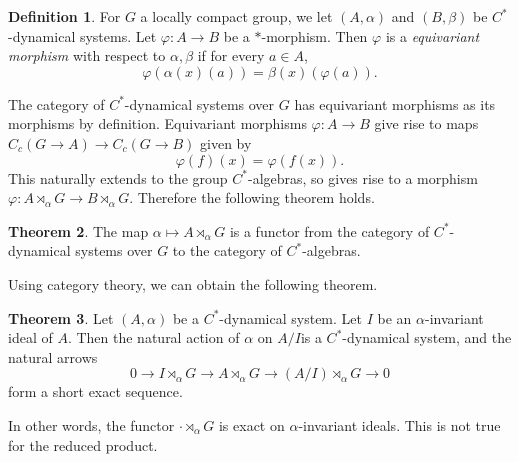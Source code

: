 \documentclass[12pt]{report}
\newcommand{\dfn}[1]{\emph{#1}\index{#1}}
\theoremstyle{definition}
\newtheorem{theorem}{Theorem}[chapter]
\newtheorem{definition}[theorem]{Definition}
\begin{document}
\begin{definition}
    For $G$ a locally compact group, we let $(A, \alpha)$ and $(B, \beta)$ be $C^*$-dynamical systems. Let $\varphi: A \to B$ be a $*$-morphism. Then $\varphi$ is a \dfn{equivariant morphism} with respect to $\alpha,\beta$ if for every $a \in A$,
    $$\varphi(\alpha(x)(a)) = \beta(x)(\varphi(a)).$$
\end{definition}
    The category of $C^*$-dynamical systems over $G$ has equivariant morphisms as its morphisms by definition. Equivariant morphisms $\varphi:A \to B$ give rise to maps $C_c(G \to A) \to C_c(G \to B)$ given by
    $$\varphi(f)(x) = \varphi(f(x)).$$
    This naturally extends to the group $C^*$-algebras, so gives rise to a morphism $\varphi: A \rtimes_\alpha G \to B \rtimes_\alpha G$. Therefore the following theorem holds.
\begin{theorem}
    The map $\alpha \mapsto A \rtimes_\alpha G$ is a functor from the category of $C^*$-dynamical systems over $G$ to the category of $C^*$-algebras.
\end{theorem}
    Using category theory, we can obtain the following theorem.
\begin{theorem}
    Let $(A, \alpha)$ be a $C^*$-dynamical system. Let $I$ be an $\alpha$-invariant ideal of $A$. Then the natural action of $\alpha$ on $A/I$is a $C^*$-dynamical system, and the natural arrows
    $$0 \to I \rtimes_\alpha G \to A \rtimes_\alpha G \to (A/I) \rtimes_\alpha G \to 0$$
    form a short exact sequence.
\end{theorem}
    In other words, the functor $\cdot \rtimes_\alpha G$ is exact on $\alpha$-invariant ideals. This is not true for the reduced product.
\end{document}
